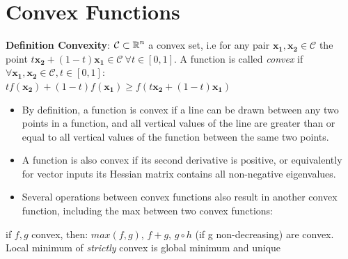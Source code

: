 \documentclass[english]{latex4ei/latex4ei_sheet}
\begin{document}
\section{Convex Functions}
\begin{sectionbox}
\begin{emphbox}
    \textbf{Definition Convexity}: $\mathcal{C}\subset\operatorname{\mathbb R}^n$ a convex set, i.e for any pair $\boldsymbol{x_1,x_2}\in\mathcal{C}$ the point $t\boldsymbol{x_2}+(1-t)\boldsymbol{x_1} \in \mathcal{C} \ \forall t\in[0,1]$. A function is called \emph{convex} if $\forall \boldsymbol{x_1,x_2}\in \mathcal{C}, t\in[0,1]$:\\
    $tf(\boldsymbol{x_2})+(1-t)f(\boldsymbol{x_1}) \ge f(t\boldsymbol{x_2}+(1-t)\boldsymbol{x_1}) $
\end{emphbox}
\begin{itemize}
\item By definition, a function is convex if a line can be drawn between any two points in a function, and all vertical values of the line are greater than or equal to all vertical values of the function between the same two points.
\item A function is also convex if its second derivative is positive, or equivalently for vector inputs its Hessian matrix contains all non-negative eigenvalues.
\item Several operations between convex functions also result in another convex function, including the max between two convex functions:
\end{itemize}
\begin{emphbox}
    if $f,g$ convex, then: $max(f,g)$, $f+g$, $g\circ h$ (if g non-decreasing) are convex. Local minimum of \emph{strictly} convex is global minimum and unique
\end{emphbox}
\end{sectionbox}
\end{document}
